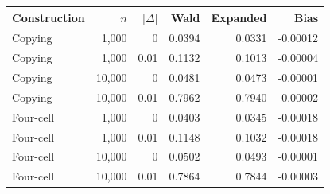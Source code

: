 \begin{tabular}{@{}lrrrrr@{}}\toprule
Construction & \(n\) & \(|\Delta|\) & Wald & Expanded & Bias\\\midrule
Copying & 1,000 & 0 & 0.0394 & 0.0331 & -0.00012\\
Copying & 1,000 & 0.01 & 0.1132 & 0.1013 & -0.00004\\
Copying & 10,000 & 0 & 0.0481 & 0.0473 & -0.00001\\
Copying & 10,000 & 0.01 & 0.7962 & 0.7940 & 0.00002\\
Four-cell & 1,000 & 0 & 0.0403 & 0.0345 & -0.00018\\
Four-cell & 1,000 & 0.01 & 0.1148 & 0.1032 & -0.00018\\
Four-cell & 10,000 & 0 & 0.0502 & 0.0493 & -0.00001\\
Four-cell & 10,000 & 0.01 & 0.7864 & 0.7844 & -0.00003\\
\bottomrule\end{tabular}
